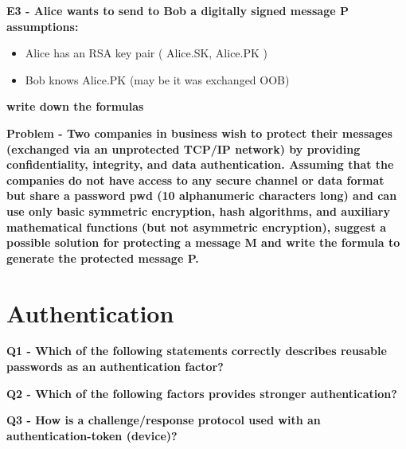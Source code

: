 \textbf{E3 - Alice wants to send to Bob a digitally signed message P}
\textbf{assumptions:}
\begin{itemize}
    \item Alice has an RSA key pair ( Alice.SK, Alice.PK )
    \item Bob knows Alice.PK (may be it was exchanged OOB)
\end{itemize}
\textbf{write down the formulas}

\textbf{Problem - Two companies in business wish to protect their messages
(exchanged via an unprotected TCP/IP network) by
providing confidentiality, integrity, and data authentication.
Assuming that the companies do not have access to any
secure channel or data format but share a password pwd
(10 alphanumeric characters long) and can use only basic
symmetric encryption, hash algorithms, and auxiliary
mathematical functions (but not asymmetric encryption),
suggest a possible solution for protecting a message M and
write the formula to generate the protected message P.\\}


\section*{Authentication}
\textbf{Q1 - Which of the following statements correctly describes reusable passwords as an authentication factor?}

\textbf{Q2 - Which of the following factors provides stronger authentication?}

\textbf{Q3 - How is a challenge/response protocol used with an authentication-token (device)?}

